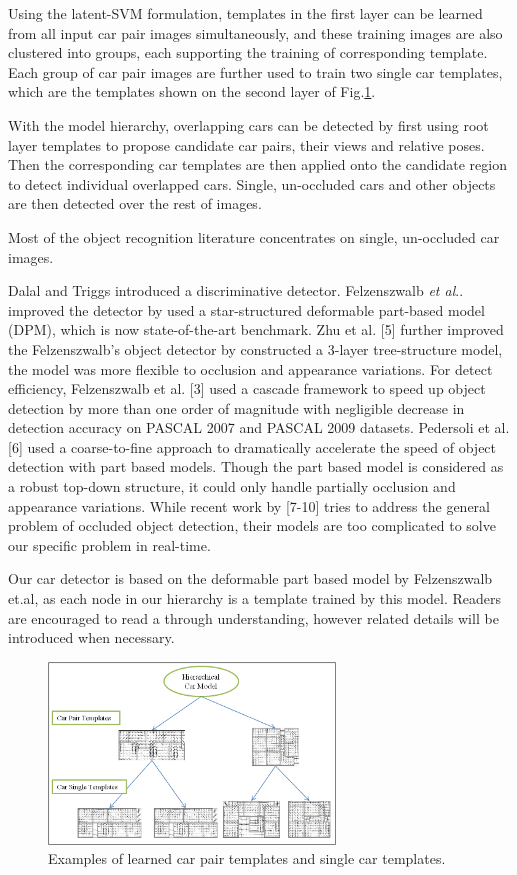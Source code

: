 \documentclass[times, 10pt,twocolumn]{article}
\makeatletter
\DeclareRobustCommand\onedot{\futurelet\@let@token\@onedot}
\def\@onedot{\ifx\@let@token.\else.\null\fi\xspace}
\def\etal{\emph{et al}\onedot}
\makeatother
\begin{document}
Using the latent-SVM formulation, templates in the first layer can be learned from all input car pair images simultaneously, and these training images are also clustered into groups, each supporting the training of corresponding template. Each group of car pair images are further used to train two single car templates, which are the templates shown on the second layer of Fig.\ref{fig::model}.

With the model hierarchy, overlapping cars can be detected by first using root layer templates to propose candidate car pairs, their views and relative poses. Then the corresponding car templates are then applied onto the candidate region to detect individual overlapped cars. Single, un-occluded cars and other objects are then detected over the rest of images.

Most of the object recognition literature concentrates on single, un-occluded car images.


 Dalal and Triggs \cite{hog} introduced a discriminative detector. Felzenszwalb \etal \cite{DPM} improved the detector by used a star-structured deformable part-based model (DPM), which is now state-of-the-art benchmark. Zhu et al. [5] further improved the Felzenszwalb's object detector by constructed a 3-layer tree-structure model, the model was more flexible to occlusion and appearance variations.  For detect efficiency, Felzenszwalb et al. [3] used a cascade framework to speed up object detection by more than one order of magnitude with negligible decrease in detection accuracy on PASCAL 2007 and PASCAL 2009 datasets. Pedersoli et al. [6] used a coarse-to-fine approach to dramatically accelerate the speed of object detection with part based models. Though the part based model is considered as a robust top-down structure, it could only handle partially occlusion and appearance variations. While recent work by [7-10] tries to address the general problem of occluded object detection, their models are too complicated to solve our specific problem in real-time.


Our car detector is based on the deformable part based model by Felzenszwalb et.al, as each node in our hierarchy is a template trained by this model. Readers are encouraged to read \cite{DPM} a through understanding, however related details will be introduced when necessary.


\begin{figure}
\centering
\includegraphics[width=3in]{./figs/fig1.png}
\caption{Examples of learned car pair templates and single car templates.}
\label{fig::model}
\end{figure}
\end{document}
